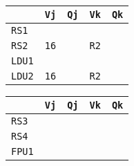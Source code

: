 \begin{enumerate}
    \begin{minipage}{0.45\textwidth}
        \centering
        \begin{tabular}{@{} l | l l l l @{}}
            \toprule
                & \texttt{Vj} & \texttt{Qj} & \texttt{Vk} & \texttt{Qk} \\
            \midrule
            \texttt{RS1} & & & & \\ [.3em]
            \texttt{RS2} & \texttt{16} & & \texttt{R2} & \\
            \cmidrule{1-5}
            \texttt{LDU1} & & & & \\ [.3em]
            \texttt{LDU2} & \texttt{16} & & \texttt{R2} & \\
            \bottomrule
        \end{tabular}
    \end{minipage}
    \hfill
    \begin{minipage}{0.45\textwidth}
        \centering
        \begin{tabular}{@{} l | l l l l @{}}
            \toprule
            & \texttt{Vj} & \texttt{Qj} & \texttt{Vk} & \texttt{Qk} \\
            \midrule
            \texttt{RS3} & & & & \\ [.3em]
            \texttt{RS4} & & & & \\
            \cmidrule{1-5}
            \texttt{FPU1} & & & & \\
            \bottomrule
        \end{tabular}
    \end{minipage}


\end{enumerate}
